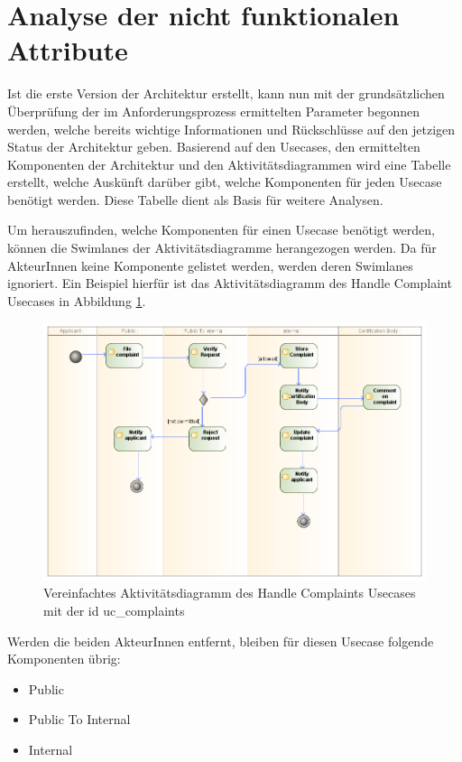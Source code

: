 \section{Analyse der nicht funktionalen Attribute}
Ist die erste Version der Architektur erstellt, kann nun mit der grundsätzlichen Überprüfung der im Anforderungsprozess ermittelten Parameter begonnen werden, welche bereits wichtige Informationen und Rückschlüsse auf den jetzigen Status der Architektur geben. Basierend auf den Usecases, den ermittelten Komponenten der Architektur und den Aktivitätsdiagrammen wird eine Tabelle erstellt, welche Auskünft darüber gibt, welche Komponenten für jeden Usecase benötigt werden. Diese Tabelle dient als Basis für weitere Analysen.

Um herauszufinden, welche Komponenten für einen Usecase benötigt werden, können die Swimlanes der Aktivitätsdiagramme herangezogen werden. Da für AkteurInnen keine Komponente gelistet werden, werden deren Swimlanes ignoriert. Ein Beispiel hierfür ist das Aktivitätsdiagramm des Handle Complaint Usecases in Abbildung \ref{fig:handlecomplaintreview}.

\begin{figure}[H]
    \centering
    \includegraphics[scale=0.5]{uml/handlecomplaintsactivityreview.png}
    \caption{Vereinfachtes Aktivitätsdiagramm des Handle Complaints Usecases mit der id uc\_complaints}
    \label{fig:handlecomplaintreview}
\end{figure}

Werden die beiden AkteurInnen entfernt, bleiben für diesen Usecase folgende Komponenten übrig:

\begin{itemize}
  \item Public
  \item Public To Internal
  \item Internal
\end{itemize}

